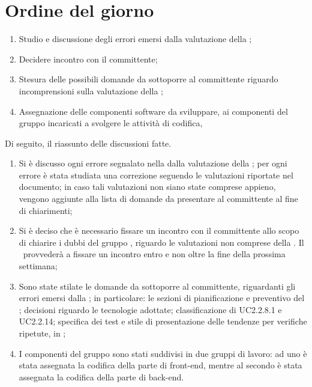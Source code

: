 \documentclass[../AnalisiDeiRequisiti.tex]{subfiles}
\begin{document}
	\section*{Ordine del giorno}
		\begin{enumerate}
			\item Studio e discussione degli errori emersi dalla valutazione della \revisionediprogettazione;
			\item Decidere incontro con il committente;
			\item Stesura delle possibili domande da sottoporre al committente riguardo incomprensioni sulla valutazione della \revisionediprogettazione;
			\item Assegnazione delle componenti software da sviluppare, ai componenti del gruppo incaricati a svolgere le attività di codifica, 
		\end{enumerate}
		Di seguito, il riassunto delle discussioni fatte.
		\begin{enumerate}
		\item Si è discusso ogni errore segnalato nella dalla valutazione della \revisionediprogettazione; per ogni errore è stata studiata una correzione seguendo le valutazioni riportate nel documento; in caso tali valutazioni non siano state comprese appieno, vengono aggiunte alla lista di domande da presentare al committente al fine di chiarimenti;
		\item Si è deciso che è necessario fissare un incontro con il committente allo scopo di chiarire i dubbi del gruppo \kaleidoscode, riguardo le valutazioni non comprese della \revisionediprogettazione. Il \responsabilediprogetto\ provvederà a fissare un incontro entro e non oltre la fine della prossima settimana;
		\item Sono state stilate le domande da sottoporre al committente, riguardanti gli errori emersi dalla \revisionediprogettazione; in particolare: le sezioni di pianificazione e preventivo del \pianodiprogetto; decisioni riguardo le tecnologie adottate; classificazione di UC2.2.8.1 e UC2.2.14; specifica dei test e stile di presentazione delle tendenze per verifiche ripetute, in \pianodiqualifica;
		\item I componenti del gruppo sono stati suddivisi in due gruppi di lavoro: ad uno è stata assegnata la codifica della parte di front-end, mentre al secondo è stata assegnata la codifica della parte di back-end. 
		
		\end{enumerate}
\end{document}
